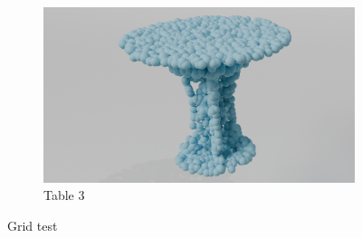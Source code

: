 \begin{figure}[htb]
\begin{subfigure}[t]{0.315\textwidth}
        \includegraphics[width=\textwidth]{figures/com_t3.png}
        \caption{Table 3}
    \end{subfigure}
    \caption{Grid test}
    \label{fig:table}
\end{figure}